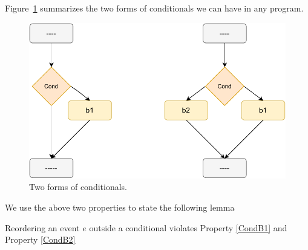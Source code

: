         Figure~\ref{reord:conditionals} summarizes the two forms of conditionals we can have in any program. 
        \begin{figure}[H]
            \centering 
            \includegraphics[scale=0.7]{5.InstructionReordering/5.ValidReorderingProgram/Conditionals2Form.pdf}
            \caption{Two forms of conditionals.}
            \label{reord:conditionals}
        \end{figure}


        We use the above two properties to state the following lemma 
        \begin{lemma}
            \label{CondBranchLemma}
            Reordering an event $e$ outside a conditional violates Property \ref{CondB1} and Property \ref{CondB2}
        \end{lemma}

